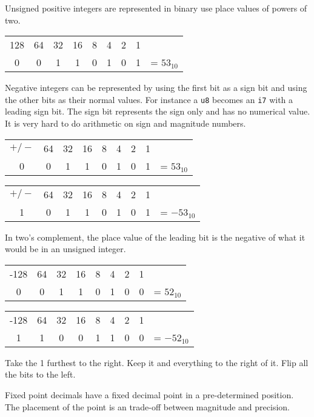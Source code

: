 \documentclass[../main.tex]{subfile}
\begin{document}

Unsigned positive integers are represented in binary use place values of powers of two.

\begin{tabular}{ccccccccc}
	128 & 64 & 32 & 16 & 8 & 4 & 2 & 1 &\\
	0 & 0 & 1 & 1 & 0 & 1 & 0 & 1 & = $53_{10}$
\end{tabular}


Negative integers can be represented by using the first bit as a sign bit and using the other bits as their normal values. For instance a \texttt{u8} becomes an \texttt{i7} with a leading sign bit. The sign bit represents the sign only and has no numerical value. It is very hard to do arithmetic on sign and magnitude numbers.

\begin{tabular}{ccccccccc}
	$+/-$ & 64 & 32 & 16 & 8 & 4 & 2 & 1 &\\
	0 & 0 & 1 & 1 & 0 & 1 & 0 & 1 & = $53_{10}$
\end{tabular}

\begin{tabular}{ccccccccc}
	$+/-$ & 64 & 32 & 16 & 8 & 4 & 2 & 1 &\\
	1 & 0 & 1 & 1 & 0 & 1 & 0 & 1 & = $-53_{10}$
\end{tabular}


In two's complement, the place value of the leading bit is the negative of what it would be in an unsigned integer.

\begin{tabular}{ccccccccc}
	-128 & 64 & 32 & 16 & 8 & 4 & 2 & 1 &\\
	0 & 0 & 1 & 1 & 0 & 1 & 0 & 0 & = $52_{10}$
\end{tabular}

\begin{tabular}{ccccccccc}
	-128 & 64 & 32 & 16 & 8 & 4 & 2 & 1 &\\
	1 & 1 & 0 & 0 & 1 & 1 & 0 & 0 & = $-52_{10}$
\end{tabular}

Take the 1 furthest to the right. Keep it and everything to the right of it. Flip all the bits to the left.


Fixed point decimals have a fixed decimal point in a pre-determined position. The placement of the point is an trade-off between magnitude and precision.
\end{document}
